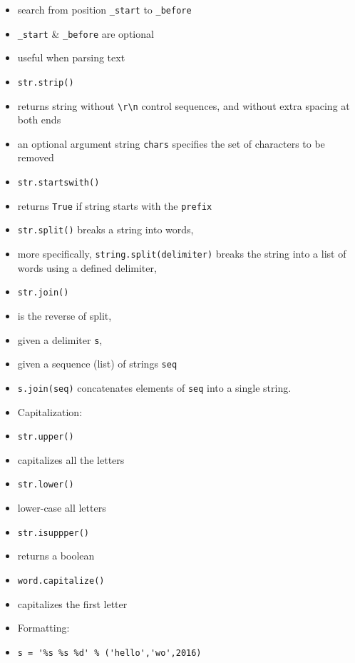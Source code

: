 \documentclass[onecolumn]{IEEEtran} %
\begin{document}
\begin{itemize}
            \item search from position \verb|_start| to \verb|_before|
            \item \verb|_start| \& \verb|_before| are optional
            \item useful when parsing text
        \ei
        \item \verb|str.strip()|
        \bi
            \item returns string without  \verb|\r\n| control sequences, and without extra spacing at both ends
            \item an optional argument string \verb|chars| specifies the set of characters to be removed
        \ei
        \item \verb|str.startswith()|
        \bi
            \item returns \verb|True| if string starts with the \verb|prefix|
        \ei
        \item \verb|str.split()| breaks a string into words,
        \bi
            \item more specifically, \verb|string.split(delimiter)| breaks the string into a list of words using a defined delimiter,
        \ei
        \item \verb|str.join()|
        \bi
            \item is the reverse of split,
            \item given a delimiter \verb|s|,
            \item given a sequence (list) of strings \verb|seq|
            \item \verb|s.join(seq)| concatenates elements of \verb|seq| into a single string.
        \ei
    \ei
    \item Capitalization:
    \bi
        \item \verb|str.upper()|
        \bi
            \item capitalizes all the letters
        \ei
        \item \verb|str.lower()|
        \bi
            \item lower-case all letters
        \ei
        \item \verb|str.isuppper()|
        \bi
            \item returns a boolean
        \ei
        \item \verb|word.capitalize()|
        \bi
            \item capitalizes the first letter
        \ei
    \ei
    \item Formatting:
    \bi
        \item \verb|s = '%s %s %d' % ('hello','wo',2016)|
    \ei
\end{itemize}
\end{document}
